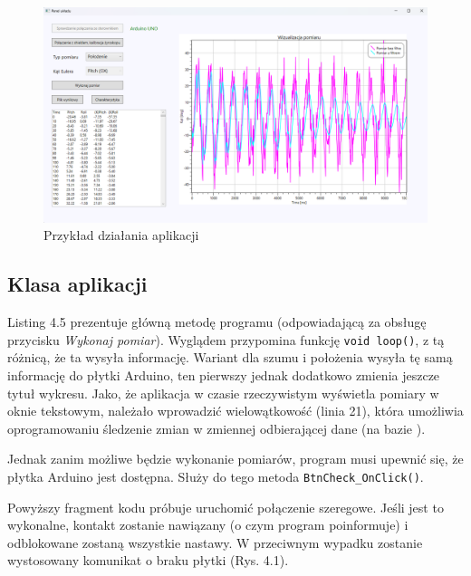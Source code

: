 \begin{figure}[H]
    \centering
    \includegraphics[width=\textwidth]{pictures/example.png}
    \caption{Przykład działania aplikacji}
    \label{fig:my_label}
\end{figure}

\subsection{Klasa aplikacji}



Listing 4.5 prezentuje główną metodę programu (odpowiadającą za obsługę przycisku \emph{Wykonaj pomiar}). Wyglądem przypomina funkcję \lstinline{void loop()}, z tą różnicą, że ta wysyła informację. Wariant dla szumu i położenia wysyła tę samą informację do płytki Arduino, ten pierwszy jednak dodatkowo zmienia jeszcze tytuł wykresu. Jako, że aplikacja w czasie rzeczywistym wyświetla pomiary w oknie tekstowym, należało wprowadzić wielowątkowość (linia 21), która umożliwia oprogramowaniu śledzenie zmian w zmiennej odbierającej dane (na bazie \cite{csh}).

Jednak zanim możliwe będzie wykonanie pomiarów, program musi upewnić się, że płytka Arduino jest dostępna. Służy do tego metoda \lstinline{BtnCheck_OnClick()}.



Powyższy fragment kodu próbuje uruchomić połączenie szeregowe. Jeśli jest to wykonalne, kontakt zostanie nawiązany (o czym program poinformuje) i odblokowane zostaną wszystkie nastawy. W przeciwnym wypadku zostanie wystosowany komunikat o braku płytki (Rys. 4.1).

